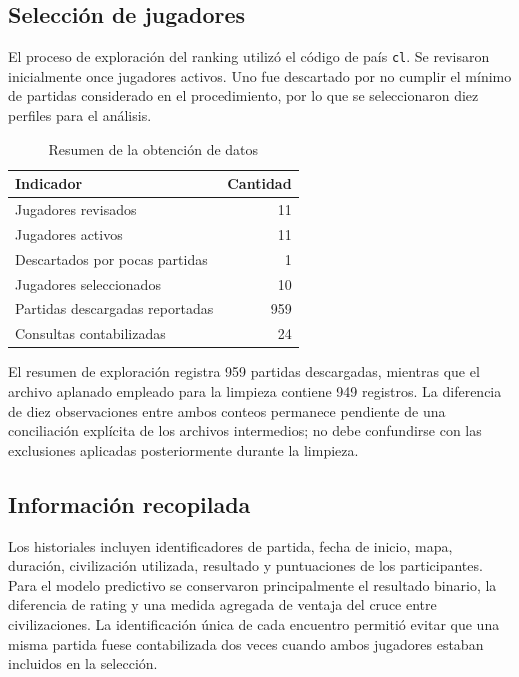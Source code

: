 \documentclass[12pt,a4paper]{article}
\begin{document}
\subsection{Selección de jugadores}

El proceso de exploración del ranking utilizó el código de país \texttt{cl}. Se revisaron inicialmente once jugadores activos. Uno fue descartado por no cumplir el mínimo de partidas considerado en el procedimiento, por lo que se seleccionaron diez perfiles para el análisis.

\begin{table}[htbp]
\centering
\caption{Resumen de la obtención de datos}
\label{tab:obtencion}
\begin{tabular}{lr}
\toprule
\textbf{Indicador} & \textbf{Cantidad}\\
\midrule
Jugadores revisados & 11\\
Jugadores activos & 11\\
Descartados por pocas partidas & 1\\
Jugadores seleccionados & 10\\
Partidas descargadas reportadas & 959\\
Consultas contabilizadas & 24\\
\bottomrule
\end{tabular}
\end{table}

El resumen de exploración registra 959 partidas descargadas, mientras que el archivo aplanado empleado para la limpieza contiene 949 registros. La diferencia de diez observaciones entre ambos conteos permanece pendiente de una conciliación explícita de los archivos intermedios; no debe confundirse con las exclusiones aplicadas posteriormente durante la limpieza.

\subsection{Información recopilada}

Los historiales incluyen identificadores de partida, fecha de inicio, mapa, duración, civilización utilizada, resultado y puntuaciones de los participantes. Para el modelo predictivo se conservaron principalmente el resultado binario, la diferencia de rating y una medida agregada de ventaja del cruce entre civilizaciones. La identificación única de cada encuentro permitió evitar que una misma partida fuese contabilizada dos veces cuando ambos jugadores estaban incluidos en la selección.
\end{document}

